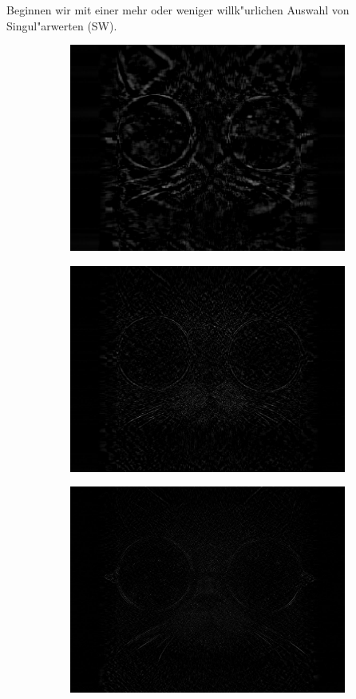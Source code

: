 Beginnen wir mit einer mehr oder weniger willk"urlichen Auswahl von Singul"arwerten (SW).

\begin{figure}[h!]\label{im:cat:interval}
\center
\begin{subfigure}[c]{.3\textwidth}
\includegraphics[width=.9\linewidth]{images/cat10-30}
\end{subfigure}
\begin{subfigure}[c]{.3\textwidth}
\includegraphics[width=.9\linewidth]{images/cat40-90}
\end{subfigure}
\begin{subfigure}[c]{.3\textwidth}
\includegraphics[width=.9\linewidth]{images/cat100-400}

\end{subfigure}
\end{figure}
